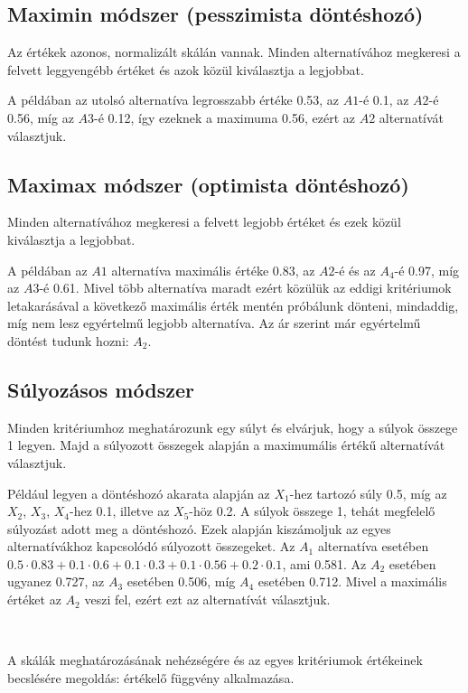 \documentclass[a4paper,12pt]{article}
\begin{document}
\subsection{Maximin módszer (pesszimista döntéshozó)}

Az értékek azonos, normalizált skálán vannak. Minden alternatívához megkeresi a felvett leggyengébb értéket és azok közül kiválasztja a legjobbat.

A példában az utolsó alternatíva legrosszabb értéke 0.53, az $A1$-é 0.1, az $A2$-é 0.56, míg az $A3$-é 0.12, így ezeknek a maximuma 0.56, ezért az $A2$ alternatívát választjuk.

\subsection{Maximax módszer (optimista döntéshozó)}

Minden alternatívához megkeresi a felvett legjobb értéket és ezek közül kiválasztja a legjobbat.

A példában az $A1$ alternatíva maximális értéke 0.83, az $A2$-é és az  $A_4$-é  0.97, míg az $A3$-é 0.61. Mivel több alternatíva maradt ezért közülük az eddigi kritériumok letakarásával a következő maximális érték mentén próbálunk dönteni, mindaddig, míg nem lesz egyértelmű legjobb alternatíva. Az ár szerint már egyértelmű döntést tudunk hozni: $A_2$.


\subsection{Súlyozásos módszer}

Minden kritériumhoz meghatározunk egy súlyt és elvárjuk, hogy a súlyok összege 1 legyen. Majd a súlyozott összegek alapján a maximumális értékű alternatívát választjuk. 

Például legyen a döntéshozó akarata alapján az $X_1$-hez tartozó súly 0.5, míg az $X_2$, $X_3$, $X_4$-hez 0.1, illetve az $X_5$-höz 0.2. A súlyok összege 1, tehát megfelelő súlyozást adott meg a döntéshozó. Ezek alapján kiszámoljuk az egyes alternatívákhoz kapcsolódó súlyozott összegeket. Az $A_1$ alternatíva esetében $0.5\cdot0.83+0.1\cdot0.6+0.1\cdot0.3+0.1\cdot0.56+0.2\cdot0.1$, ami 0.581. Az $A_2$ esetében ugyanez 0.727, az $A_3$ esetében 0.506, míg $A_4$ esetében 0.712. Mivel a maximális értéket az $A_2$ veszi fel, ezért ezt az alternatívát választjuk. 


\

A skálák meghatározásának nehézségére és az egyes kritériumok értékeinek becslésére megoldás: értékelő függvény alkalmazása.
\end{document}

